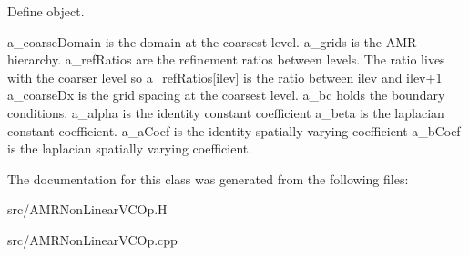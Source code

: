 Define object. 

a\-\_\-coarse\-Domain is the domain at the coarsest level. a\-\_\-grids is the A\-M\-R hierarchy. a\-\_\-ref\-Ratios are the refinement ratios between levels. The ratio lives with the coarser level so a\-\_\-ref\-Ratios\mbox{[}ilev\mbox{]} is the ratio between ilev and ilev+1 a\-\_\-coarse\-Dx is the grid spacing at the coarsest level. a\-\_\-bc holds the boundary conditions. a\-\_\-alpha is the identity constant coefficient a\-\_\-beta is the laplacian constant coefficient. a\-\_\-a\-Coef is the identity spatially varying coefficient a\-\_\-b\-Coef is the laplacian spatially varying coefficient. 

The documentation for this class was generated from the following files\-:\begin{DoxyCompactItemize}
\item 
src/A\-M\-R\-Non\-Linear\-V\-C\-Op.\-H\item 
src/A\-M\-R\-Non\-Linear\-V\-C\-Op.\-cpp\end{DoxyCompactItemize}
